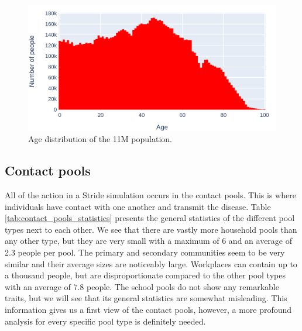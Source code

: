 \begin{figure}
    \centering
    \includegraphics[width=.8\textwidth]{3 - Stride/fig/population_age_distribution.png}
    \caption{Age distribution of the 11M population.}
    \label{fig:age_distribution}
\end{figure}

\subsection{Contact pools}
\label{subsec:contact_pools_data}
All of the action in a Stride simulation occurs in the contact pools. This is where individuals have contact with one another and transmit the disease. Table \ref{tab:contact_pools_statistics} presents the general statistics of the different pool types next to each other. We see that there are vastly more household pools than any other type, but they are very small with a maximum of 6 and an average of 2.3 people per pool. The primary and secondary communities seem to be very similar and their average sizes are noticeably large. Workplaces can contain up to a thousand people, but are disproportionate compared to the other pool types with an average of 7.8 people. The school pools do not show any remarkable traits, but we will see that its general statistics are somewhat misleading. This information gives us a first view of the contact pools, however, a more profound analysis for every specific pool type is definitely needed.

